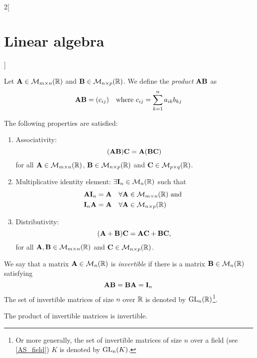 \documentclass[../../../main.tex]{subfiles}
\begin{document}
\begin{multicols}{2}[\section{Linear algebra}]
\begin{proposition}
\begin{enumerate}
    \end{enumerate}
  \end{proposition}
  \begin{definition}
    Let $\boldsymbol{\mathrm{A}}\in\mathcal{M}_{m\times n}(\mathbb{R})$ and $\boldsymbol{\mathrm{B}}\in\mathcal{M}_{n\times p}(\mathbb{R})$. We define the \emph{product} $\boldsymbol{\mathrm{A}}\boldsymbol{\mathrm{B}}$ as $$\boldsymbol{\mathrm{A}}\boldsymbol{\mathrm{B}}=(c_{ij})\quad\text{where }c_{ij}=\sum_{k=1}^na_{ik}b_{kj}$$
  \end{definition}
  \begin{proposition}
    The following properties are satisfied:
    \begin{enumerate}
      \item Associativity: $$(\boldsymbol{\mathrm{A}}\boldsymbol{\mathrm{B}})\boldsymbol{\mathrm{C}}=\boldsymbol{\mathrm{A}}(\boldsymbol{\mathrm{B}}\boldsymbol{\mathrm{C}})$$ for all $\boldsymbol{\mathrm{A}}\in\mathcal{M}_{m\times n}(\mathbb{R})$, $\boldsymbol{\mathrm{B}}\in\mathcal{M}_{n\times p}(\mathbb{R})$ and $\boldsymbol{\mathrm{C}}\in\mathcal{M}_{p\times q}(\mathbb{R})$.
      \item Multiplicative identity element: $\exists\boldsymbol{\mathrm{I}}_n\in\mathcal{M}_n(\mathbb{R})$ such that
            \begin{align*}
               & \boldsymbol{\mathrm{A}}\boldsymbol{\mathrm{I}}_n=\boldsymbol{\mathrm{A}}\quad\forall\boldsymbol{\mathrm{A}}\in\mathcal{M}_{m\times n}(\mathbb{R})\text{ and } \\
               & \boldsymbol{\mathrm{I}}_n\boldsymbol{\mathrm{A}}=\boldsymbol{\mathrm{A}}\quad\forall\boldsymbol{\mathrm{A}}\in\mathcal{M}_{n\times p}(\mathbb{R})
            \end{align*}
      \item Distributivity: $$(\boldsymbol{\mathrm{A}}+\boldsymbol{\mathrm{B}})\boldsymbol{\mathrm{C}}=\boldsymbol{\mathrm{A}}\boldsymbol{\mathrm{C}}+\boldsymbol{\mathrm{B}}\boldsymbol{\mathrm{C}},$$ for all $\boldsymbol{\mathrm{A}},\boldsymbol{\mathrm{B}}\in\mathcal{M}_{m\times n}(\mathbb{R})$ and $\boldsymbol{\mathrm{C}}\in\mathcal{M}_{n\times p}(\mathbb{R})$.
    \end{enumerate}
  \end{proposition}
  \begin{definition}
    We say that a matrix $\boldsymbol{\mathrm{A}}\in\mathcal{M}_n(\mathbb{R})$ is \emph{invertible} if there is a matrix $\boldsymbol{\mathrm{B}}\in\mathcal{M}_n(\mathbb{R})$ satisfying $$\boldsymbol{\mathrm{A}}\boldsymbol{\mathrm{B}}=\boldsymbol{\mathrm{B}}\boldsymbol{\mathrm{A}}=\boldsymbol{\mathrm{I}}_n$$
    The set of invertible matrices of size $n$ over $\mathbb{R}$ is denoted by $\mathrm{GL}_n(\mathbb{R})$\footnote{Or more generally, the set of invertible matrices of size $n$ over a field (see \cref{AS_field}) $K$ is denoted by $\mathrm{GL}_n(K)$.}.
  \end{definition}
  \begin{lemma}
    The product of invertible matrices is invertible.
  \end{lemma}

\end{multicols}
\end{document}
